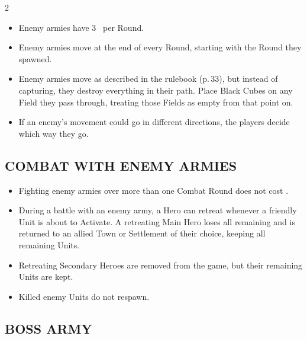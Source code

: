 \begin{multicols}{2}
\begin{itemize}
  \item Enemy armies have 3~ per Round.
  \item Enemy armies move at the end of every Round, starting with the Round they spawned.
  \item Enemy armies move as described in the rulebook (p.\,33), but instead of capturing, they destroy everything in their path.
    Place Black Cubes on any Field they pass through, treating those Fields as empty from that point on.
  \item If an enemy's movement could go in different directions, the players decide which way they go.
\end{itemize}

\subsection*{\MakeUppercase{Combat with Enemy Armies}}

\begin{itemize}
  \item Fighting enemy armies over more than one Combat Round does not cost .
  \item During a battle with an enemy army, a Hero can retreat whenever a friendly Unit is about to Activate.
    A retreating Main Hero loses all remaining  and is returned to an allied Town or Settlement of their choice, keeping all remaining Units.
  \item Retreating Secondary Heroes are removed from the game, but their remaining Units are kept.
  \item Killed enemy Units do not respawn.
\end{itemize}

\subsection*{\MakeUppercase{Boss Army}}


\end{multicols}
